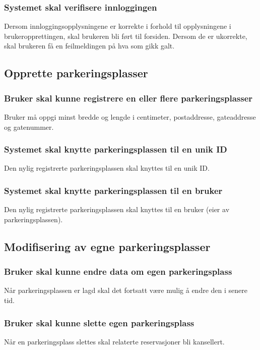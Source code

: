 \documentclass[12pt]{article}
\begin{document}
\subsubsection{Systemet skal verifisere innloggingen}
Dersom innloggingsopplysningene er korrekte i forhold til opplysningene i brukeropprettingen, skal brukeren bli ført til forsiden. Dersom de er ukorrekte, skal brukeren få en feilmeldingen på hva som gikk galt.

\subsection{Opprette parkeringsplasser}

\subsubsection{Bruker skal kunne registrere en eller flere parkeringsplasser}
Bruker må oppgi minst bredde og lengde i centimeter, postaddresse, gateaddresse og gatenummer.

\subsubsection{Systemet skal knytte parkeringsplassen til en unik ID}
Den nylig registrerte parkeringsplassen skal knyttes til en unik ID.

\subsubsection{Systemet skal knytte parkeringsplassen til en bruker}
Den nylig registrerte parkeringsplassen skal knyttes til en bruker (eier av parkeringsplassen).

\subsection{Modifisering av egne parkeringsplasser}

\subsubsection{Bruker skal kunne endre data om egen parkeringsplass}
Når parkeringsplassen er lagd skal det fortsatt være mulig å endre den i senere tid.

\subsubsection{Bruker skal kunne slette egen parkeringsplass}
Når en parkeringsplass slettes skal relaterte reservasjoner bli kansellert.
\end{document}
